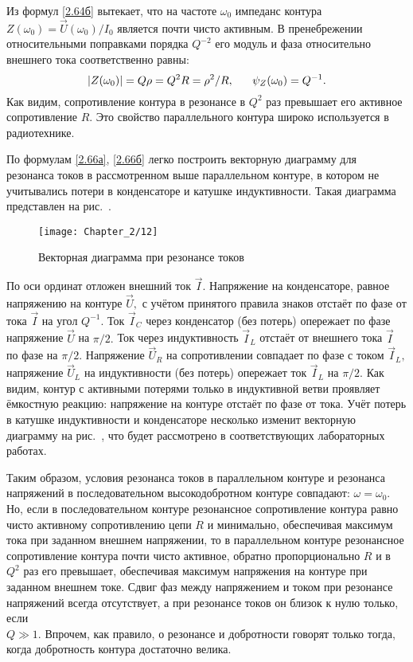 Из формул \eqref{2.64б} вытекает, что на частоте $\omega_0$ импеданс контура $Z(\omega_0)=\vec U(\omega_0)/I_0$ является почти чисто активным. В пренебрежении относительными поправками порядка $Q^{-2}$ его модуль и фаза относительно внешнего тока соответственно равны:
\setcounter{equation}{66}
\begin{equation}\eqmark{2.67}
|Z(\omega_0)|=Q\rho=Q^2R=\rho^2/R,~~~~~\psi_Z(\omega_0)=Q^{-1}.
\end{equation}
Как видим, сопротивление контура в резонансе в $Q^2$ раз превышает его активное сопротивление $R.$ Это свойство параллельного контура широко используется в радиотехнике.

По формулам \eqref{2.66а}, \eqref{2.66б} легко построить векторную диаграмму для резонанса токов в рассмотренном выше параллельном контуре, в котором не учитывались потери в конденсаторе и катушке индуктивности. Такая диаграмма представлен на рис.~.

\begin{figure}[h!]
	\centering\texttt{[image: Chapter\_2/12]}
	\caption{Векторная диаграмма при резонансе токов}
\end{figure}

По оси ординат отложен внешний ток $\vec I.$ Напряжение на конденсаторе, равное напряжению на контуре $\vec U,$ с учётом принятого правила знаков отстаёт по фазе от тока $\vec I$ на угол $Q^{-1}.$ Ток $\vec I_C$ через конденсатор (без потерь) опережает по фазе напряжение $\vec U$ на $\pi/2.$ Ток через индуктивность $\vec I_L$ отстаёт от внешнего тока $\vec I$ по фазе на $\pi/2.$  Напряжение $\vec U_R$ на сопротивлении совпадает по фазе с током $\vec I_L,$ напряжение $\vec U_L$ на индуктивности (без потерь) опережает ток $\vec I_L$ на $\pi/2.$ Как видим, контур с активными потерями только в индуктивной ветви проявляет ёмкостную реакцию: напряжение на контуре отстаёт по фазе от тока. Учёт потерь в катушке индуктивности и конденсаторе несколько изменит векторную диаграмму на рис.~, что будет рассмотрено в соответствующих лабораторных работах.

Таким образом, условия резонанса токов в параллельном контуре и резонанса напряжений в последовательном высокодобротном контуре совпадают: $\omega=\omega_0.$ Но, если в последовательном контуре резонансное сопротивление контура равно чисто активному сопротивлению цепи $R$ и минимально, обеспечивая максимум тока при заданном внешнем напряжении, то в параллельном контуре резонансное сопротивление контура почти чисто активное, обратно пропорционально $R$ и в $Q^2$ раз его превышает, обеспечивая максимум напряжения на контуре при заданном внешнем токе. Сдвиг фаз между напряжением и током при резонансе напряжений всегда отсутствует, а при резонансе токов он близок к нулю только, если \\$Q\gg1.$ Впрочем, как правило, о резонансе и добротности говорят только тогда, когда добротность контура достаточно велика.

